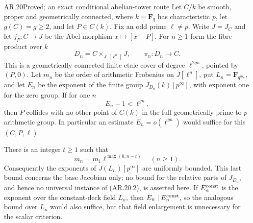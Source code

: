 \begin{claim}{AR.20}{Proved; an exact conditional abelian-tower route}
Let $C/k$ be smooth, proper and geometrically connected,
where $k=\mathbf F_q$ has characteristic $p$, let
$g(C)=g\ge2$, and let $P\in C(k)$. Fix an odd prime
$\ell\ne p$. Write $J=J_C$ and let
$j_P:C\to J$ be the Abel morphism $x\mapsto[x-P]$.
For $n\ge1$ form the fibre product over $k$
\[
 D_n=C\mathbin{\times}_{J,[\ell^n]}J,
 \qquad \pi_n:D_n\longrightarrow C.
                                                        \tag{AR.20.1}
\]
This is a geometrically connected finite etale cover
of degree $\ell^{2gn}$, pointed by $(P,0)$. Let $m_n$
be the order of arithmetic Frobenius on $J[\ell^n]$,
put $L_n=\mathbf F_{q^{m_n}}$, and let $E_n$ be the
exponent of the finite group $J_{D_n}(k)[p^\infty]$,
with exponent one for the zero group. If for one $n$
\[
                       E_n-1<\ell^{gn},                 \tag{AR.20.2}
\]
then $P$ collides with no other point of $C(k)$ in
the full geometrically prime-to-$p$ arithmetic group.
In particular an estimate $E_n=o(\ell^{gn})$ would
suffice for this $(C,P,\ell)$.

There is an integer $t\ge1$ such that
\[
           m_n=m_1\ell^{\max(0,n-t)}\quad(n\ge1).
                                                        \tag{AR.20.3}
\]
Consequently the exponents of $J(L_n)[p^\infty]$ are
uniformly bounded. This last bound concerns the base
Jacobian only; no bound for the relative parts of
$J_{D_n}$, and hence no universal instance of
(AR.20.2), is asserted here. If $E_n^{\rm const}$
is the exponent over the constant-deck field $L_n$,
then $E_n\mid E_n^{\rm const}$, so the analogous
bound over $L_n$ would also suffice, but that field
enlargement is unnecessary for the scalar criterion.
\end{claim}
